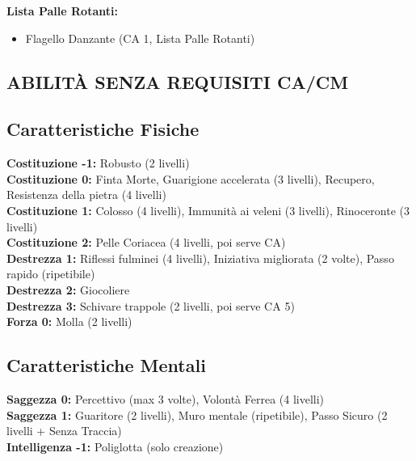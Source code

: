 \begin{multicols}{2}
	\textbf{Lista Palle Rotanti:}
	\begin{itemize}
		\item Flagello Danzante (CA 1, Lista Palle Rotanti)
	\end{itemize}

	\subsection{ABILITÀ SENZA REQUISITI CA/CM}

	\subsection{Caratteristiche Fisiche}
	\textbf{Costituzione -1:} Robusto (2 livelli)\\
	\textbf{Costituzione 0:} Finta Morte, Guarigione accelerata (3 livelli), Recupero, Resistenza della pietra (4 livelli)\\
	\textbf{Costituzione 1:} Colosso (4 livelli), Immunità ai veleni (3 livelli), Rinoceronte (3 livelli)\\
	\textbf{Costituzione 2:} Pelle Coriacea (4 livelli, poi serve CA)\\
	\textbf{Destrezza 1:} Riflessi fulminei (4 livelli), Iniziativa migliorata (2 volte), Passo rapido (ripetibile)\\
	\textbf{Destrezza 2:} Giocoliere\\
	\textbf{Destrezza 3:} Schivare trappole (2 livelli, poi serve CA 5)\\
	\textbf{Forza 0:} Molla (2 livelli)\\

	\subsection{Caratteristiche Mentali}
	\textbf{Saggezza 0:} Percettivo (max 3 volte), Volontà Ferrea (4 livelli)\\
	\textbf{Saggezza 1:} Guaritore (2 livelli), Muro mentale (ripetibile), Passo Sicuro (2 livelli + Senza Traccia)\\
	\textbf{Intelligenza -1:} Poliglotta (solo creazione)\\


\end{multicols}
